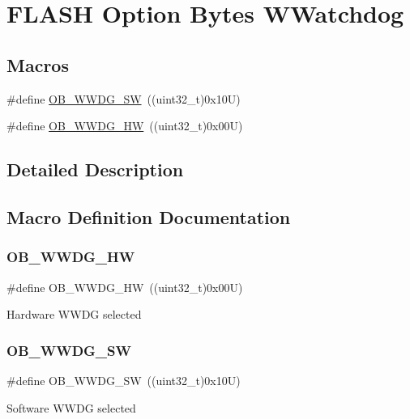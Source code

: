 \hypertarget{group___f_l_a_s_h_ex___option___bytes___w_watchdog}{}\section{F\+L\+A\+SH Option Bytes W\+Watchdog}
\label{group___f_l_a_s_h_ex___option___bytes___w_watchdog}
\subsection*{Macros}
\begin{DoxyCompactItemize}
\item 
\#define \mbox{\hyperlink{group___f_l_a_s_h_ex___option___bytes___w_watchdog_ga1e5f3b6d137856b1acc34e7dbc81ffd9}{O\+B\+\_\+\+W\+W\+D\+G\+\_\+\+SW}}~((uint32\+\_\+t)0x10\+U)
\item 
\#define \mbox{\hyperlink{group___f_l_a_s_h_ex___option___bytes___w_watchdog_ga32aa93fb6a71b73966b2bf934927835f}{O\+B\+\_\+\+W\+W\+D\+G\+\_\+\+HW}}~((uint32\+\_\+t)0x00\+U)
\end{DoxyCompactItemize}


\subsection{Detailed Description}


\subsection{Macro Definition Documentation}
\mbox{\label{group___f_l_a_s_h_ex___option___bytes___w_watchdog_ga32aa93fb6a71b73966b2bf934927835f}} 
\subsubsection{\texorpdfstring{OB\_WWDG\_HW}{OB\_WWDG\_HW}}
{\footnotesize\ttfamily \#define O\+B\+\_\+\+W\+W\+D\+G\+\_\+\+HW~((uint32\+\_\+t)0x00\+U)}

Hardware W\+W\+DG selected \mbox{\label{group___f_l_a_s_h_ex___option___bytes___w_watchdog_ga1e5f3b6d137856b1acc34e7dbc81ffd9}} 
\subsubsection{\texorpdfstring{OB\_WWDG\_SW}{OB\_WWDG\_SW}}
{\footnotesize\ttfamily \#define O\+B\+\_\+\+W\+W\+D\+G\+\_\+\+SW~((uint32\+\_\+t)0x10\+U)}

Software W\+W\+DG selected 